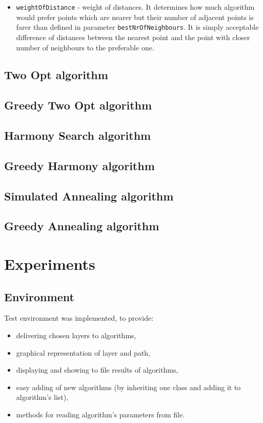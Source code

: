 \documentclass[titlepage]{article}
\begin{document}
\begin{itemize}
	\item \texttt{weightOfDistance} - weight of distances. It determines how much algorithm would prefer points which are nearer but their number of adjacent points is farer than defined in parameter \texttt{bestNrOfNeighbours}. It is simply acceptable difference of distances between the nearest point and the point with closer number of neighbours to the preferable one.
	
\end{itemize}

\subsection{Two Opt algorithm}

\subsection{Greedy Two Opt algorithm}

\subsection{Harmony Search algorithm}

\subsection{Greedy Harmony algorithm}

\subsection{Simulated Annealing algorithm}

\subsection{Greedy Annealing algorithm}

\section{Experiments}
\subsection{Environment}
Test environment was implemented, to provide:
\begin{itemize}
\item delivering chosen layers to algorithms,
\item graphical representation of layer and path,
\item displaying and showing to file results of algorithms,
\item easy adding of new algorithms (by inheriting one class and adding it to algorithm's list),
\item methods for reading algorithm's parameters from file.
\end{itemize}
\end{document}
